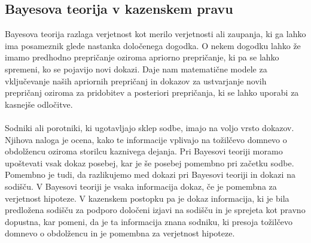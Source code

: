 \documentclass[12pt,a4paper]{amsart}
\theoremstyle{definition} %
\theoremstyle{plain} %
\begin{document}
\subsection{Bayesova teorija v kazenskem pravu}
Bayesova teorija razlaga verjetnost kot merilo verjetnosti ali zaupanja, ki ga lahko ima posameznik glede nastanka določenega dogodka.
O nekem dogodku lahko že imamo predhodno prepričanje oziroma apriorno prepričanje, ki pa se lahko spremeni, ko se pojavijo novi dokazi. Daje nam
matematične modele za vključevanje naših apriornih prepričanj in dokazov za ustvarjanje novih prepričanj oziroma za pridobitev a posteriori
prepričanja, ki se lahko uporabi za kasnejše odločitve.\\\\
Sodniki ali porotniki, ki ugotavljajo sklep sodbe, imajo na voljo vrsto dokazov. Njihova naloga je ocena, kako te informacije vplivajo na tožilčevo
domnevo o obdolžencu oziroma storilcu kaznivega dejanja. Pri Bayesovi teoriji moramo upoštevati vsak dokaz posebej, kar je še posebej pomembno pri
začetku sodbe. Pomembno je tudi, da razlikujemo med dokazi pri Bayesovi teoriji in dokazi na sodišču. V Bayesovi teoriji je vsaka informacija
dokaz, če je pomembna za verjetnost hipoteze. V kazenskem postopku pa je dokaz informacija, ki je bila predložena sodišču za podporo določeni
izjavi na sodišču in je sprejeta kot pravno dopustna, kar pomeni, da je ta informacija znana sodniku, ki presoja tožilčevo domnevo o obdolžencu in je
pomembna za verjetnost hipoteze.

\end{document}
